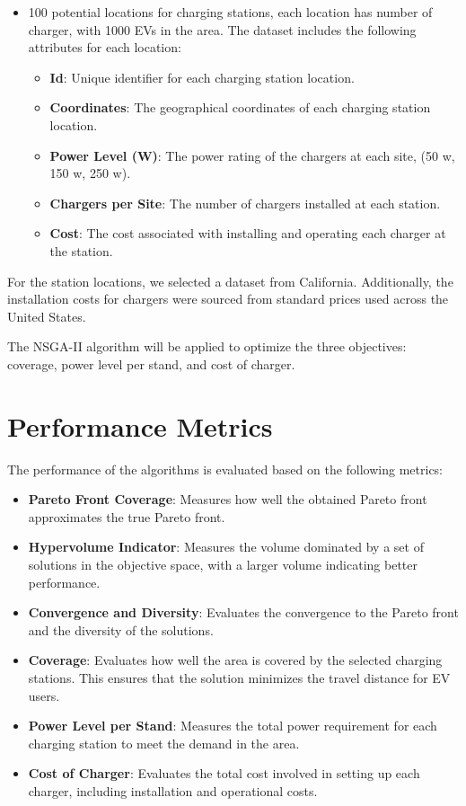 \documentclass[12pt]{report}
\begin{document}
\begin{itemize}
    \item 100 potential locations for charging stations, each location has number of charger, with 1000 EVs in the area. The dataset includes the following attributes for each location:
    \begin{itemize}
        \item \textbf{Id}: Unique identifier for each charging station location.
        \item \textbf{Coordinates}: The geographical coordinates of each charging station location.
        \item \textbf{Power Level (W)}: The power rating of the chargers at each site, (50 w, 150 w, 250 w).
        \item \textbf{Chargers per Site}: The number of chargers installed at each station.
        \item \textbf{Cost}: The cost associated with installing and operating each charger at the station.
    \end{itemize}
\end{itemize}

For the station locations, we selected a dataset from California. Additionally, the installation costs for chargers were sourced from standard prices used across the United States.

The NSGA-II algorithm will be applied to optimize the three objectives: coverage, power level per stand, and cost of charger.


\section{Performance Metrics}
The performance of the algorithms is evaluated based on the following metrics:
\begin{itemize}
    \item \textbf{Pareto Front Coverage}: Measures how well the obtained Pareto front approximates the true Pareto front.
    \item \textbf{Hypervolume Indicator}: Measures the volume dominated by a set of solutions in the objective space, with a larger volume indicating better performance.
    \item \textbf{Convergence and Diversity}: Evaluates the convergence to the Pareto front and the diversity of the solutions.
    \item \textbf{Coverage}: Evaluates how well the area is covered by the selected charging stations. This ensures that the solution minimizes the travel distance for EV users.
    \item \textbf{Power Level per Stand}: Measures the total power requirement for each charging station to meet the demand in the area.
    \item \textbf{Cost of Charger}: Evaluates the total cost involved in setting up each charger, including installation and operational costs.
\end{itemize}
\end{document}
